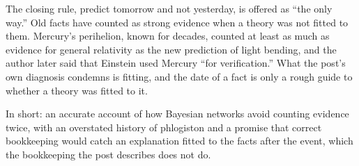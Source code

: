 \begin{afterword}
The closing rule, predict tomorrow and not yesterday, is offered as ``the only way.'' Old facts have counted as strong evidence when a theory was not fitted to them. Mercury's perihelion, known for decades, counted at least as much as evidence for general relativity as the new prediction of light bending, and the author later said that Einstein used Mercury ``for verification.'' What the post's own diagnosis condemns is fitting, and the date of a fact is only a rough guide to whether a theory was fitted to it.

In short: an accurate account of how Bayesian networks avoid counting evidence twice, with an overstated history of phlogiston and a promise that correct bookkeeping would catch an explanation fitted to the facts after the event, which the bookkeeping the post describes does not do.
\end{afterword}
